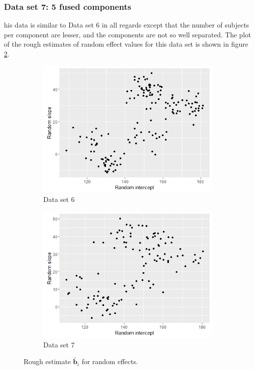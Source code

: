\subsubsection{Data set 7: 5 fused components}
\label{subsubsec : ds_5fused}
his data is similar to Data set 6 in all regards except that the number of subjects per component are lesser, and the components are not so well separated. The plot of the rough estimates of random effect values for this data set is shown in figure \ref{fig : ds_5fused_randplot}.

\begin{figure}[!htb]
\centering
\begin{subfigure}[b]{0.4\textwidth}
		\includegraphics[width=\textwidth]{mainmatter/chapter_5_simulation_study/ds_5wellsep_randplot.png}
        \caption{\label{fig : ds_5wellsep_randplot}Data set 6}
	\end{subfigure}
	\begin{subfigure}[b]{0.4\textwidth}
		\includegraphics[width=\textwidth]{mainmatter/chapter_5_simulation_study/ds_5fused_randplot.png}
        \caption{\label{fig : ds_5fused_randplot}Data set 7}
	\end{subfigure}
	\caption{Rough estimate $\tilde{\boldsymbol{b}_i}$ for random effects.}
	\label{fig : ds_5wellsep_5fused}    
\end{figure}


